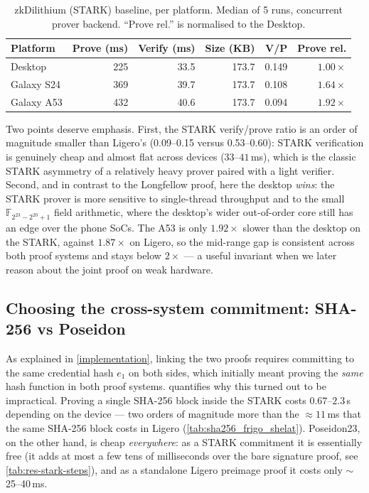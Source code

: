 \documentclass{article}
\begin{document}
\begin{table}[ht]
  \centering
  \caption{zkDilithium (STARK) baseline, per platform. Median of 5 runs,
  concurrent prover backend. ``Prove rel.'' is normalised to the Desktop.}
  \label{tab:res-base-stark}
  \small
  \begin{tabular}{@{}lrrrrr@{}}
    \toprule
    \textbf{Platform} & \textbf{Prove (ms)} & \textbf{Verify (ms)} & \textbf{Size (KB)} & \textbf{V/P} & \textbf{Prove rel.} \\
    \midrule
    Desktop    & 225 & 33.5 & 173.7 & 0.149 & $1.00\times$ \\
    Galaxy S24 & 369 & 39.7 & 173.7 & 0.108 & $1.64\times$ \\
    Galaxy A53 & 432 & 40.6 & 173.7 & 0.094 & $1.92\times$ \\
    \bottomrule
  \end{tabular}
\end{table}

Two points deserve emphasis. First, the STARK verify/prove ratio is an order of
magnitude smaller than Ligero's (0.09--0.15 versus 0.53--0.60): STARK
verification is genuinely cheap and almost flat across devices ($33$--$41$\,ms),
which is the classic STARK asymmetry of a relatively heavy prover paired with a
light verifier. Second, and in contrast to the Longfellow proof, here the desktop
\emph{wins}: the STARK prover is more sensitive to single-thread throughput and
to the small $\mathbb{F}_{2^{23}-2^{20}+1}$ field arithmetic, where the desktop's
wider out-of-order core still has an edge over the phone SoCs. The A53 is only
$1.92\times$ slower than the desktop on the STARK, against $1.87\times$ on Ligero,
so the mid-range gap is consistent across both proof systems and stays below
$2\times$ --- a useful invariant when we later reason about the joint proof on
weak hardware.

\subsection{Choosing the cross-system commitment: SHA-256 vs Poseidon}
\label{results:hash}
As explained in \cref{implementation}, linking the two proofs requires committing
to the same credential hash $e_1$ on both sides, which initially meant proving
the \emph{same} hash function in both proof systems. 
quantifies why this turned out to be impractical. Proving a single SHA-256 block
inside the STARK costs $0.67$--$2.3$\,s depending on the device --- two orders of
magnitude more than the ${\approx}11$\,ms that the same SHA-256 block costs in
Ligero (\cref{tab:sha256_frigo_shelat}). Poseidon23, on the other hand, is cheap
\emph{everywhere}: as a STARK commitment it is essentially free (it adds at most
a few tens of milliseconds over the bare signature proof, see
\cref{tab:res-stark-steps}), and as a standalone Ligero preimage proof it costs
only $\sim$25--40\,ms.
\end{document}
